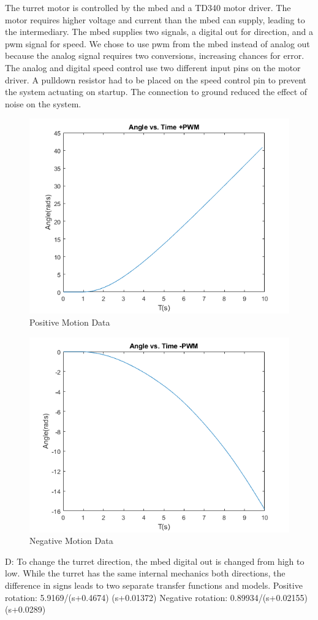 The turret motor is controlled by the mbed and a TD340 motor driver. The motor requires higher voltage and current than the mbed can supply, leading to the intermediary. The mbed supplies two signals, a digital out for direction, and a pwm signal for speed. We chose to use pwm from the mbed instead of analog out because the analog signal requires two conversions, increasing chances for error. The analog and digital speed control use two different input pins on the motor driver. A pulldown resistor had to be placed on the speed control pin to prevent the system actuating on startup. The connection to ground reduced the effect of noise on the system.
\begin{figure}[h]
    \centering
    \includegraphics[scale=.4]{pos mot data.png}
    \caption{Positive Motion Data}
    \label{fig:pos mot}
\end{figure}
\begin{figure}[h]
    \centering
    \includegraphics[scale=.4]{neg mot data.png}
    \caption{Negative Motion Data}
    \label{fig:neg mot data}
\end{figure}
D: To change the turret direction, the mbed digital out is changed from high to low. While the turret has the same internal mechanics both directions, the difference in signs leads to two separate transfer functions and models. Positive rotation: 5.9169/(s+0.4674) (s+0.01372) 
Negative rotation: 0.89934/(s+0.02155) (s+0.0289)

